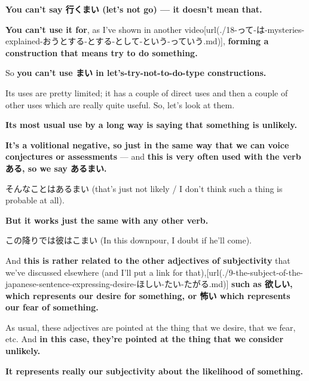 {\bf You can't say 行くまい (let's not go) --- it doesn't mean that.}

{\bf You can't use it for}, as I've shown in another video\goto{{[}18{]}}[url(./18-って-は-mysteries-explained-おうとする-とする-として-という-っていう.md)], {\bf forming a construction that means try to do something.}

So {\bf you can't use まい in let's-try-not-to-do-type constructions.}

\stopsectionlevel

\startsectionlevel[title={The uses of まい},reference={the-uses-of-まい}]

Its uses are pretty limited; it has a couple of direct uses and then a couple of other uses which are really quite useful. So, let's look at them.

\startsectionlevel[title={Using まい to say that something is unlikely},reference={using-まい-to-say-that-something-is-unlikely}]

{\bf Its most usual use by a long way is saying that something is unlikely.}

{}

{\bf It's a volitional negative, so just in the same way that we can voice conjectures or assessments} --- and {\bf this is very often used with the verb ある, so we say あるまい.}

そんなことはあるまい (that's just not likely / I don't think such a thing is probable at all).

{\bf But it works just the same with any other verb.}

この降りでは彼はこまい (In this downpour, I doubt if he'll come).

{}

And {\bf this is rather related to the other adjectives of subjectivity} that we've discussed elsewhere (and I'll put a link for that),\goto{{[}9{]}}[url(./9-the-subject-of-the-japanese-sentence-expressing-desire-ほしい-たい-たがる.md)] {\bf such as 欲しい, which represents our desire for something, or 怖い which represents our fear of something.}

{}

As usual, these adjectives are pointed at the thing that we desire, that we fear, etc. And {\bf in this case, they're pointed at the thing that we consider unlikely.}

{\bf It represents really our subjectivity about the likelihood of something.}

